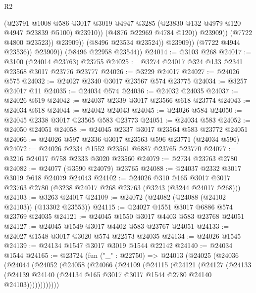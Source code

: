 \begin{lexlean}{R2}
\begin{coremodule}
                                (@23791
                                  @1008
                                  @586
                                  @3017
                                  @3019
                                  @4947
                                  @3285
                                  (@23830 @132 @4979 @120 @4947 @23839 @5100)
                                  @23910))
                              (@4876 @22969 @4784 @120))
                            @23909))
                        (@7722 @4800 @23523))
                      @23909))
                  (@8496 @23534 @23524))
                @23909))
            (@7722 @4944 @23536))
          @23909))
      (@8496 @22958 @23544))
@24014 := @3103 @268
@24017 := @3100 (@24014 @23763) @23755
@24025 := @3274 @24017 @324 @133 @2341 @23568 @3017 @23776 @23777
@24026 := @3229 @24017
@24027 := @24026 @575
@24032 := @24027 @2340 @3017 @23567 @574 @23775
@24034 := @3257 @24017 @11
@24035 := @24034 @574
@24036 := @24032 @24035
@24037 := @24026 @619
@24042 := @24037 @2339 @3017 @23566 @618 @23774
@24043 := @24034 @618
@24044 := @24042 @24043
@24045 := @24026 @584
@24050 := @24045 @2338 @3017 @23565 @583 @23773
@24051 := @24034 @583
@24052 := @24050 @24051
@24058 := @24045 @2337 @3017 @23564 @583 @23772 @24051
@24066 := @24026 @597 @2336 @3017 @23563 @596 @23771 (@24034 @596)
@24072 := @24026 @2334 @1552 @23561 @6887 @23765 @23770
@24077 := @3216 @24017 @758 @2333 @3020 @23560
@24079 := @2734 @23763 @2780
@24082 := @24077 (@3590 @24079) @23765
@24088 := @24037 @2332 @3017 @3019 @618 @24079 @24043
@24102 := @24026
    @310
    @165
    @3017
    @3017
    @23763
    @2780
    (@3238 @24017 @268 @23763 (@3243 (@3244 @24017 @268)))
@24103 := @3263 @24017
@24109 := @24072 (@24082 (@24088 (@24102 @24103)) (@13302 @23553))
@24115 := @24027 @1551 @3017 @6886 @574 @23769 @24035
@24121 := @24045 @1550 @3017 @4403 @583 @23768 @24051
@24127 := @24045 @1549 @3017 @4402 @583 @23767 @24051
@24133 := @24027 @1548 @3017 @3020 @574 @22573 @24035
@24134 := @24026 @1545
@24139 := @24134 @1547 @3017 @3019 @1544 @22142
@24140 := @24034 @1544
@24165 := @23724
    (fun ("_" : @22750) =>
    @24013
      (@24025
        (@24036
          (@24044
            (@24052
              (@24058
                (@24066
                  (@24109
                    (@24115
                      (@24121
                        (@24127
                          (@24133
                            (@24139
                              @24140
                              (@24134 @165 @3017 @3017 @1544 @2780 @24140 @24103))))))))))))

\end{coremodule}
\end{lexlean}
